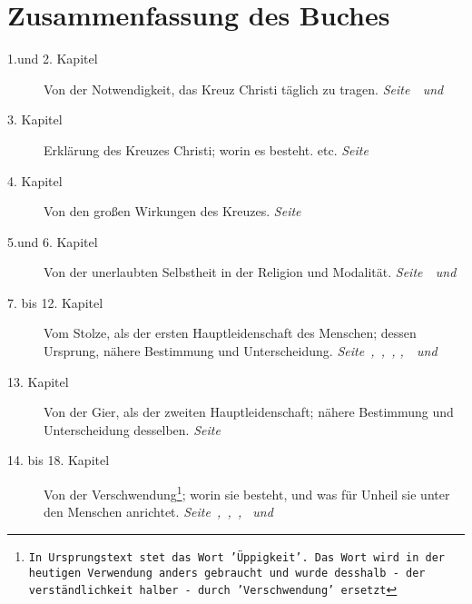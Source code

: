 \documentclass[a5paper,pagesize,9pt]{scrbook}
\begin{document}
\chapter{Zusammenfassung des Buches}
\begin{description}
\item[1.und 2. Kapitel] Von der Notwendigkeit, das Kreuz Christi täglich zu
tragen.
\dotfill \textit{Seite~\pageref{kap1}~und~\pageref{kap2}}\\
\item[3. Kapitel] Erklärung des Kreuzes Christi; worin es besteht. etc.
\dotfill \textit{Seite~\pageref{kap3}}\\
\item[4. Kapitel] Von den großen Wirkungen des Kreuzes.
\dotfill \textit{Seite~\pageref{kap4}}\\
\item[5.und 6. Kapitel] Von der unerlaubten Selbstheit in der Religion und
Modalität.
\dotfill \textit{Seite~\pageref{kap5}~und~\pageref{kap6}}\\
\item[7. bis 12. Kapitel] Vom Stolze, als der ersten Hauptleidenschaft des
Menschen; dessen Ursprung, nähere Bestimmung und Unterscheidung.
\dotfill \textit{Seite~\pageref{kap7},~\pageref{kap8},~\pageref{kap9}, \pageref{kap10},~\pageref{kap11}~und~\pageref{kap12}}\\
\item[13. Kapitel] Von der Gier, als der zweiten Hauptleidenschaft; nähere
Bestimmung und Unterscheidung desselben.
\dotfill \textit{Seite~\pageref{kap13}}\\
\item[14. bis 18. Kapitel] Von der Verschwendung\footnote{\texttt{In Ursprungstext stet
das Wort 'Üppigkeit'. Das Wort wird in der heutigen Verwendung anders
gebraucht und wurde desshalb - der verständlichkeit halber - durch
'Verschwendung' ersetzt}}; worin sie besteht, und was für Unheil sie unter den
Menschen anrichtet.
\dotfill \textit{Seite~\pageref{kap14},~\pageref{kap15},~\pageref{kap16},
\pageref{kap17}~und~\pageref{kap18}}\\
\end{description}

\end{document}
